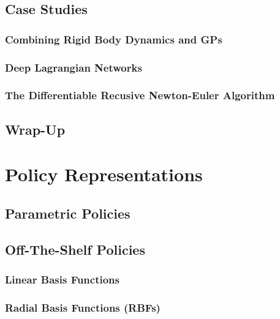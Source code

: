 	\section{Case Studies} %

		\subsection{Combining Rigid Body Dynamics and GPs} %

		\subsection{Deep Lagrangian Networks} %

		\subsection{The Differentiable Recusive Newton-Euler Algorithm} %

	\section{Wrap-Up} %

\chapter{Policy Representations} %

	\section{Parametric Policies} %

	\section{Off-The-Shelf Policies} %

		\subsection{Linear Basis Functions} %

		\subsection{Radial Basis Functions (RBFs)} %

